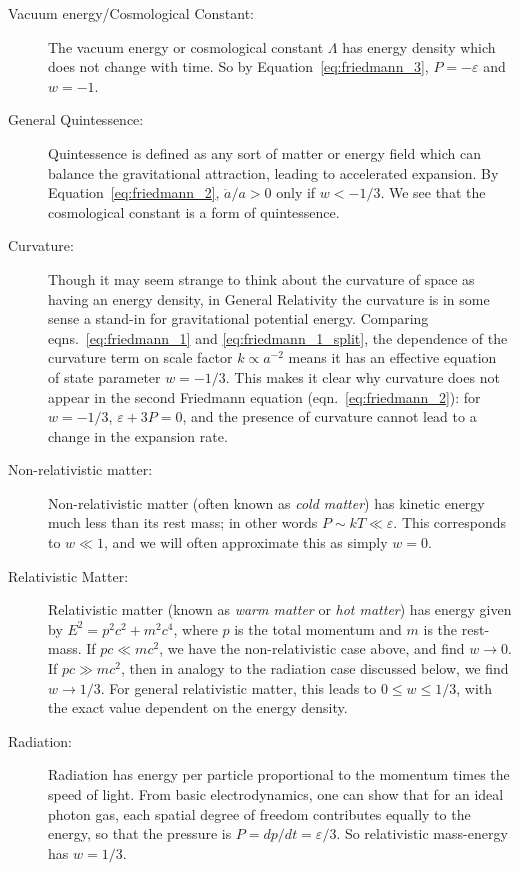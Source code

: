 \begin{description}
  \item[Vacuum energy/Cosmological Constant:]
    The vacuum energy or cosmological constant $\Lambda$ has
    energy density which does not change with time.
    So by Equation~\ref{eq:friedmann_3}, $P = -\varepsilon$ and $w = -1$.
  \item[General Quintessence:] Quintessence is defined as any sort of matter
    or energy field
    which can balance the gravitational attraction, leading to accelerated
    expansion.  By Equation~\ref{eq:friedmann_2}, $\ddot{a}/a > 0$ only
    if $w < - 1/3$.  We see that the cosmological constant is a form of
    quintessence.
  \item[Curvature:] Though it may seem strange to think about the curvature
    of space as having an energy density, in General Relativity the curvature
    is in some sense a stand-in for gravitational potential energy.  Comparing
    eqns.~\ref{eq:friedmann_1} and \ref{eq:friedmann_1_split}, the dependence
    of the curvature term on scale factor $k \propto a^{-2}$
    means it has an effective equation
    of state parameter $w = -1/3$.  This makes it clear why curvature does
    not appear in the second Friedmann equation (eqn.~\ref{eq:friedmann_2}):
    for $w=-1/3$, $\varepsilon + 3P = 0$, and the presence of curvature
    cannot lead to a change in the expansion rate.
  \item[Non-relativistic matter:] Non-relativistic matter (often known
    as {\it cold matter}) has kinetic energy much less than its rest mass;
    in other words $P \sim kT \ll \varepsilon$.  This corresponds to
    $w \ll 1$, and we will often approximate this as simply $w=0$.
  \item[Relativistic Matter:] Relativistic matter 
    (known as {\it warm matter} or {\it hot matter}) has energy given by
    $E^2 = p^2c^2 + m^2 c^4$, where $p$ is the total momentum and $m$ is
    the rest-mass.  If $pc \ll mc^2$, we have the non-relativistic
    case above, and find $w \to 0$.  If $pc \gg mc^2$, then in analogy to
    the radiation case discussed below, we find $w \to 1/3$.
    For general relativistic matter, this leads to
    $0 \le w \le 1/3$, with the exact value dependent on the energy density.
  \item[Radiation:] Radiation has energy per particle
    proportional to the momentum times the speed of light.  From basic
    electrodynamics, one can show that for an ideal photon gas, each spatial
    degree of freedom contributes equally to the energy, so that the pressure
    is $P = dp/dt = \varepsilon / 3$.  So relativistic mass-energy has
    $w = 1/3$.
\end{description}

